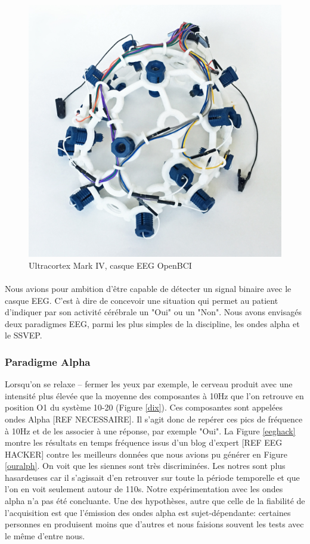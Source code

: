 \documentclass[11pt,a4paper]{article}
\theoremstyle{plain}
\theoremstyle{definition}
\begin{document}
\begin{figure}[h!]
\centering
\includegraphics[scale=0.05]{images/OpenBCI.jpg}
\caption{Ultracortex Mark IV, casque EEG OpenBCI}
\label{openbci}
\end{figure}

\paragraph{}Nous avions pour ambition d'être capable de détecter un signal binaire avec le casque EEG. C'est à dire de concevoir une situation qui permet au patient
d'indiquer par son activité cérébrale un "Oui" ou un "Non". Nous avons envisagés deux paradigmes EEG, parmi les plus simples de la discipline, les ondes alpha et 
le SSVEP. 

\subsubsection{Paradigme Alpha}

Lorsqu'on se relaxe -- fermer les yeux par exemple, le cerveau produit avec une intensité plus élevée que la moyenne des composantes à 10Hz que l'on retrouve en position O1 du système 10-20 (Figure \ref{dix}).
Ces composantes sont appelées ondes Alpha [REF NECESSAIRE]. Il s'agit donc de repérer ces pics de fréquence à 10Hz et de les associer à une réponse, par
exemple "Oui". La Figure \ref{eeghack} montre les résultats en temps fréquence issus d'un blog d'expert [REF EEG HACKER] contre les meilleurs données que nous avions pu générer en Figure \ref{ouralph}.
On voit que les siennes sont très discriminées. Les notres sont plus hasardeuses car il s'agissait d'en retrouver sur toute la période temporelle et que l'on en voit seulement autour de 110s. Notre expérimentation avec les ondes alpha n'a pas été concluante. Une des hypothèses,
autre que celle de la fiabilité de l'acquisition est que l'émission des ondes alpha est sujet-dépendante: certaines personnes en produisent moins que d'autres et nous faisions souvent
les tests avec le même d'entre nous.
\end{document}
